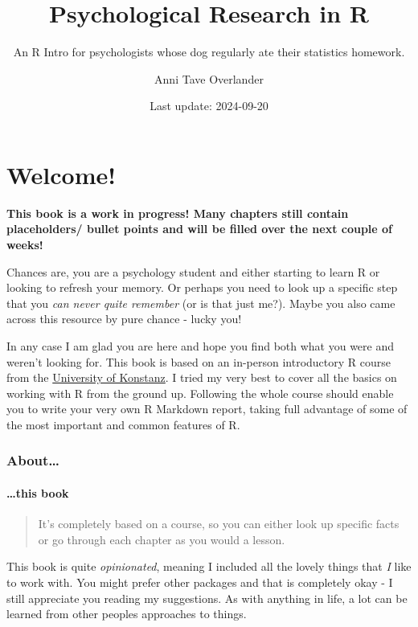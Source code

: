 \documentclass[
]{book}
\title{Psychological Research in R}
\subtitle{An R Intro for psychologists whose dog regularly ate their statistics homework.}
\author{Anni Tave Overlander}
\date{Last update: 2024-09-20}
\begin{document}
\maketitle

{
\setcounter{tocdepth}{1}
\tableofcontents
}
\chapter*{Welcome!}\label{welcome}

\textbf{This book is a work in progress! Many chapters still contain placeholders/ bullet points and will be filled over the next couple of weeks!}

Chances are, you are a psychology student and either starting to learn R or looking to refresh your memory.
Or perhaps you need to look up a specific step that you \emph{can never quite remember} (or is that just me?).
Maybe you also came across this resource by pure chance - lucky you!

In any case I am glad you are here and hope you find both what you were and weren't looking for.
This book is based on an in-person introductory R course from the \href{https://www.uni-konstanz.de/}{University of Konstanz}.
I tried my very best to cover all the basics on working with R from the ground up.
Following the whole course should enable you to write your very own R Markdown report, taking full advantage of some of the most important and common features of R.

\subsection*{About\ldots{}}\label{about}

\subsubsection*{\ldots this book}\label{this-book}

\begin{quote}
It's completely based on a course, so you can either look up specific facts or go through each chapter as you would a lesson.
\end{quote}

This book is quite \emph{opinionated}, meaning I included all the lovely things that \emph{I} like to work with.
You might prefer other packages and that is completely okay - I still appreciate you reading my suggestions.
As with anything in life, a lot can be learned from other peoples approaches to things.
\end{document}

